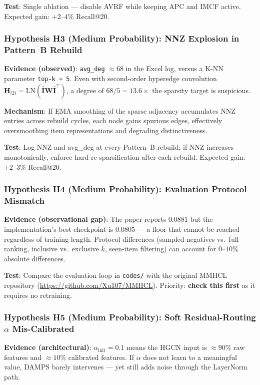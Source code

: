 \documentclass[12pt,a4paper]{article}
\begin{document}
\textbf{Test}: Single ablation --- disable AVRF while keeping APC and
IMCF active.  Expected gain: $+2$--$4\%$ Recall@20.

\subsubsection*{Hypothesis H3 (Medium Probability): NNZ Explosion in
Pattern~B Rebuild}

\textbf{Evidence (observed)}: \texttt{avg\_deg} $\approx 68$ in the
Excel log, versus a K-NN parameter \texttt{top-k = 5}.  Even with
second-order hyperedge convolution $\mathbf{H}_{i2i}
= \text{LN}(\bar{\mathbf{I}} \mathbf{W} \bar{\mathbf{I}}^\top)$,
a degree of $68 / 5 = 13.6\times$ the sparsity target is suspicious.

\textbf{Mechanism}: If EMA smoothing of the sparse adjacency accumulates
NNZ entries across rebuild cycles, each node gains spurious edges,
effectively oversmoothing item representations and degrading
distinctiveness.

\textbf{Test}: Log NNZ and avg\_deg at every Pattern~B rebuild; if NNZ
increases monotonically, enforce hard re-sparsification after each
rebuild.  Expected gain: $+2$--$3\%$ Recall@20.

\subsubsection*{Hypothesis H4 (Medium Probability): Evaluation Protocol
Mismatch}

\textbf{Evidence (observational gap)}: The paper reports $0.0881$ but
the implementation's best checkpoint is $0.0805$ --- a floor that
cannot be reached regardless of training length.  Protocol differences
(sampled negatives vs.\ full ranking, inclusive vs.\ exclusive $k$,
seen-item filtering) can account for $0$--$10\%$ absolute differences.

\textbf{Test}: Compare the evaluation loop in
\texttt{codes/} with the original MMHCL repository
(\url{https://github.com/Xu107/MMHCL}).  Priority: \textbf{check this
first} as it requires no retraining.

\subsubsection*{Hypothesis H5 (Medium Probability): Soft Residual-Routing
$\alpha$ Mis-Calibrated}

\textbf{Evidence (architectural)}: $\alpha_{\text{init}} = 0.1$ means the
HGCN input is $\approx 90\%$ raw features and $\approx 10\%$ calibrated
features.  If $\alpha$ does not learn to a meaningful value, DAMPS
barely intervenes --- yet still adds noise through the LayerNorm path.
\end{document}
